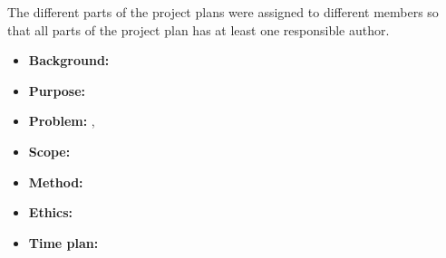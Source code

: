 The different parts of the project plans were assigned to different members so that all parts of the project plan has at least one responsible author.

\begin{itemize}
    \item \textbf{Background:} \martin
    \item \textbf{Purpose:} \jakob
    \item \textbf{Problem:} \hannes, \felix
    \item \textbf{Scope:} \jakob
    \item \textbf{Method:} \marcus
    \item \textbf{Ethics:} \arvid
    \item \textbf{Time plan:} \andtolist{\members}
\end{itemize}